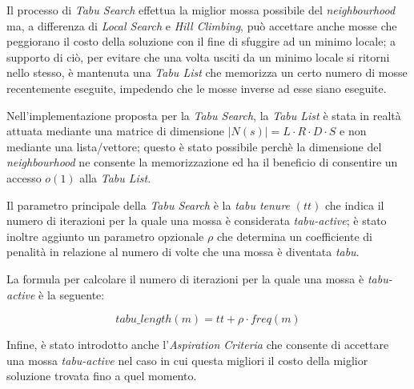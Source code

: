 \documentclass[]{article}
\begin{document}
Il processo di \textit{Tabu Search} effettua la miglior mossa possibile del \textit{neighbourhood} ma, a differenza di \textit{Local Search} e \textit{Hill Climbing}, può accettare anche mosse che peggiorano il costo della soluzione con il fine di sfuggire ad un minimo locale; a supporto di ciò, per evitare che una volta usciti da un minimo locale si ritorni nello stesso, è mantenuta una \textit{Tabu List} che memorizza un certo numero di mosse recentemente eseguite, impedendo che le mosse inverse ad esse siano eseguite.

Nell'implementazione proposta per la \textit{Tabu Search}, la \textit{Tabu List} è stata in realtà attuata mediante una matrice di dimensione $|N(s)| = L \cdot R \cdot D \cdot S$ e non mediante una lista/vettore; questo è stato possibile perchè la dimensione del \textit{neighbourhood} ne consente la memorizzazione ed ha il beneficio di consentire un accesso $o(1)$ alla \textit{Tabu List}.

Il parametro principale della \textit{Tabu Search} è la \textit{tabu tenure} $(tt)$ che indica il numero di iterazioni per la quale una mossa è considerata \textit{tabu-active}; è stato inoltre aggiunto un parametro opzionale $\rho$ che determina un coefficiente di penalità in relazione al numero di volte che una mossa è diventata \textit{tabu}.

La formula per calcolare il numero di iterazioni per la quale una mossa è \textit{tabu-active} è la seguente:

\[tabu\_length(m) = tt + \rho \cdot freq(m)\]

Infine, è stato introdotto anche l'\textit{Aspiration Criteria} che consente di accettare una mossa \textit{tabu-active} nel caso in cui questa migliori il costo della miglior soluzione trovata fino a quel momento.

\vspace{6pt}
\end{document}
